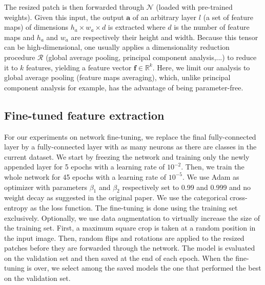 The resized patch is then forwarded through $\mathcal{N}$ (loaded with pre-trained weights). Given this input, the output $\mathbf{a}$ of an arbitrary layer $l$ (\ie a set of feature maps) of dimensions $h_a \times w_a \times d$ is extracted where $d$ is the number of feature maps and $h_a$ and $w_a$ are respectively their height and width. Because this tensor can be high-dimensional, one usually applies a dimensionality reduction procedure $\mathcal{R}$ (\eg global average pooling, principal component analysis,...) to reduce it to $k$ features, yielding a feature vector $\mathbf{f}\in \mathbb{R}^k$.  Here, we limit our analysis to global average pooling (\ie feature maps averaging), which, unlike principal component analysis for example, has the advantage of being parameter-free. %



\subsection{Fine-tuned feature extraction}
\label{ssec:comp:meth_fine_tuning}



 



For our experiments on network fine-tuning, we replace the final fully-connected layer by a fully-connected layer with as many neurons as there are classes in the current dataset. We start by freezing the network and training only the newly appended layer for 5 epochs with a learning rate of $10^{-2}$. Then, we train the whole network for 45 epochs with a learning rate of $10^{-5}$. We use Adam \parencite{kingma2014adam} as optimizer with parameters $\beta_1$ and $\beta_2$ respectively set to 0.99 and 0.999 and no weight decay as suggested in the original paper. We use the categorical cross-entropy as the loss function. The fine-tuning is done using the training set exclusively. Optionally, we use data augmentation to virtually increase the size of the training set. First, a maximum square crop is taken at a random position in the input image. %
Then, random flips and rotations are applied to the resized patches before they are forwarded through the network. The model is evaluated on the validation set and then saved at the end of each epoch. When the fine-tuning is over, we select among the saved models the one that performed the best on the validation set.


